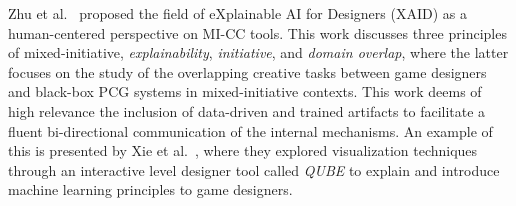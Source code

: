 
Zhu et al.~\cite{Zhu2018-XAIDesignersMICC} proposed the field of eXplainable AI for Designers (XAID) as a human-centered perspective on MI-CC tools. This work discusses three principles of mixed-initiative, \emph{explainability}, \emph{initiative}, and \emph{domain overlap}, where the latter focuses on the study of the overlapping creative tasks between game designers and black-box PCG systems in mixed-initiative contexts. This work deems of high relevance the inclusion of data-driven and trained artifacts to facilitate a fluent bi-directional communication of the internal mechanisms. An example of this is presented by Xie et al.~\cite{xie2019interactive}, where they explored visualization techniques through an interactive level designer tool called \textit{QUBE} to explain and introduce machine learning principles to game designers.









